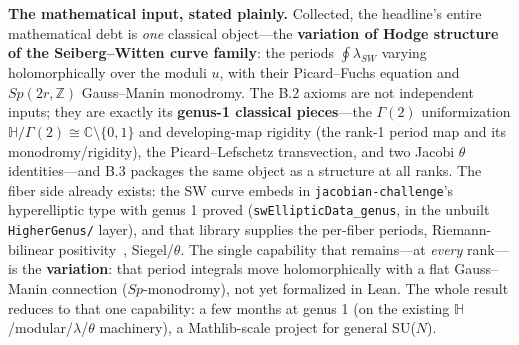 \documentclass{article}
\theoremstyle{plain}
\theoremstyle{definition}
\numberwithin{equation}{section}
\newcommand{\code}[1]{\texttt{#1}}
\begin{document}
\medskip
\noindent\textbf{The mathematical input, stated plainly.} Collected, the headline's entire
mathematical debt is \emph{one} classical object---the \textbf{variation of Hodge structure of the
Seiberg--Witten curve family}: the periods $\oint \lambda_{SW}$ varying holomorphically over the
moduli $u$, with their Picard--Fuchs equation and $Sp(2r,\mathbb{Z})$ Gauss--Manin monodromy. The
B.2 axioms are not independent inputs; they are exactly its \textbf{genus-1 classical pieces}---the
$\Gamma(2)$ uniformization $\mathbb{H}/\Gamma(2)\cong\mathbb{C}\setminus\{0,1\}$ and developing-map
rigidity (the rank-1 period map and its monodromy/rigidity), the Picard--Lefschetz transvection,
and two Jacobi $\theta$ identities---and B.3 packages the same object as a structure at all ranks.
The fiber side already exists: the SW curve embeds in \code{jacobian-challenge}'s hyperelliptic
type with genus 1 proved (\code{swEllipticData\_genus}, in the unbuilt \code{HigherGenus/}
layer), and that library supplies the
per-fiber periods, Riemann-bilinear positivity~\cite{GriffithsHarris1978}, Siegel/$\theta$. The single capability that
remains---at \emph{every} rank---is the \textbf{variation}: that period integrals move
holomorphically with a flat Gauss--Manin connection ($Sp$-monodromy), not yet formalized in Lean.
The whole result reduces to that one capability: a few months at genus 1 (on the existing
$\mathbb{H}$/modular/$\lambda$/$\theta$ machinery), a Mathlib-scale project for general SU($N$).
\end{document}
